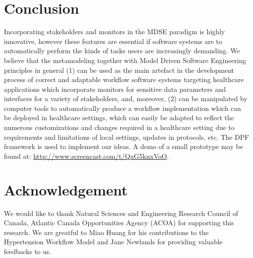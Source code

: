\documentclass[a4paper]{llncs}
\begin{document}

\section{Conclusion}\label{label:conclusion}

Incorporating stakeholders and monitors in the MDSE paradigm is highly innovative, however these features are essential if software systems are to automatically perform the kinds of tasks 
users are increasingly demanding.  We believe that the metamodeling together with Model Driven Software Engineering principles in general
(1) can be used as the main artefact in the development process of correct and adaptable workflow software systems  targeting healthcare applications which incorporate monitors for 
sensitive data parameters and interfaces for a variety of stakeholders, and, moreover, 
(2) can be manipulated by computer tools to automatically produce a workflow implementation which can be deployed in  healthcare settings, which can easily be  adapted to reflect the 
numerous customizations and changes required in a healthcare setting due to  requirements and limitations of local settings, updates in protocols, etc.
The DPF framework is used to implement our ideas.  A demo of a small prototype may be found at: \url{http://www.screencast.com/t/QxG5knxVoO}. 



\section*{Acknowledgement}\label{label:conclusion}
We would like to thank Natural Sciences and Engineering Research Council of Canada, Atlantic Canada Opportunities Agency (ACOA) for supporting this research. 
We are greatful to Miao Huang for his contributions to the Hypertension Workflow Model and Jane Newlands for providing valuable feedbacks to us. 

{}
\end{document}
